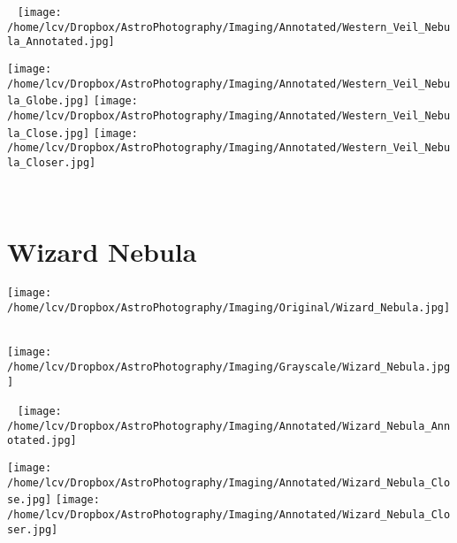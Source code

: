 \begin{center}
 \ \newpage
\texttt{[image: /home/lcv/Dropbox/AstroPhotography/Imaging/Annotated/Western\_Veil\_Nebula\_Annotated.jpg]}

\texttt{[image: /home/lcv/Dropbox/AstroPhotography/Imaging/Annotated/Western\_Veil\_Nebula\_Globe.jpg]}
\texttt{[image: /home/lcv/Dropbox/AstroPhotography/Imaging/Annotated/Western\_Veil\_Nebula\_Close.jpg]}
\texttt{[image: /home/lcv/Dropbox/AstroPhotography/Imaging/Annotated/Western\_Veil\_Nebula\_Closer.jpg]}
\end{center}
\ \\\section{Wizard Nebula}
\texttt{[image: /home/lcv/Dropbox/AstroPhotography/Imaging/Original/Wizard\_Nebula.jpg]}
{\footnotesize\color{white}


}\ \\
\texttt{[image: /home/lcv/Dropbox/AstroPhotography/Imaging/Grayscale/Wizard\_Nebula.jpg]}
\begin{center}
 \ \newpage
\texttt{[image: /home/lcv/Dropbox/AstroPhotography/Imaging/Annotated/Wizard\_Nebula\_Annotated.jpg]}

\texttt{[image: /home/lcv/Dropbox/AstroPhotography/Imaging/Annotated/Wizard\_Nebula\_Close.jpg]}
\texttt{[image: /home/lcv/Dropbox/AstroPhotography/Imaging/Annotated/Wizard\_Nebula\_Closer.jpg]}
\end{center}

